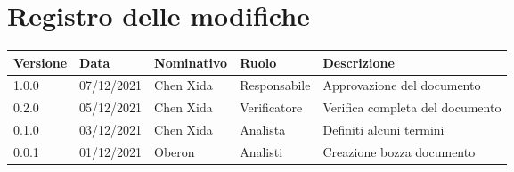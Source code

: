 \section{Registro delle modifiche}
\begin{center}
    \begin{tabular}{|p{2cm}|p{2cm}|p{}|p{}|p{3
    cm}|}

    \hline
    \rule[-4mm]{0mm}{1cm}
    \textbf{Versione} & \textbf{Data} & \textbf{Nominativo} & \textbf{Ruolo} & \textbf{Descrizione}\\
    
    \hline
    \rule[-4mm]{0mm}{1cm}
    1.0.0 & 07/12/2021 & Chen Xida & Responsabile & Approvazione del documento\\
    
    \hline
    \rule[-4mm]{0mm}{1cm}
    0.2.0 & 05/12/2021 & Chen Xida & Verificatore & Verifica completa del documento\\
    
    \hline
    \rule[-4mm]{0mm}{1cm}
    0.1.0 & 03/12/2021 & Chen Xida & Analista & Definiti alcuni termini\\
    
    \hline
    \rule[-4mm]{0mm}{1cm}
    0.0.1 & 01/12/2021 & Oberon & Analisti & Creazione bozza documento\\
    
    \hline
    \end{tabular}
\end{center}